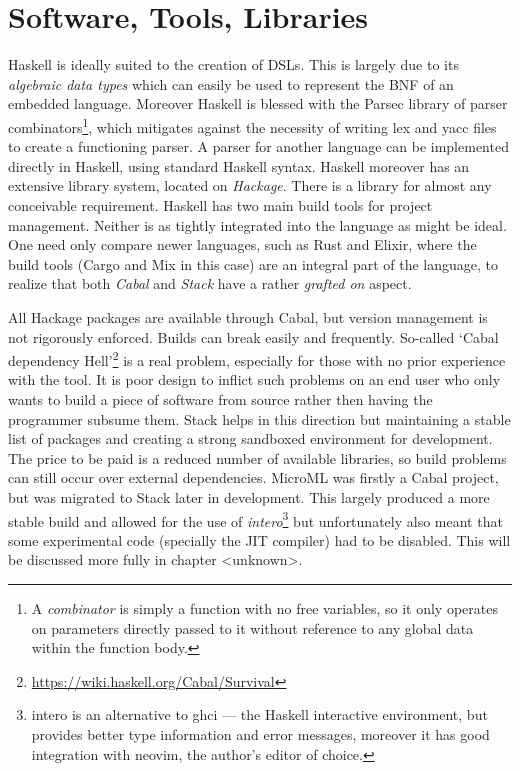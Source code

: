 \documentclass[12pt, a4paper]{report}
\begin{document}
\section{Software, Tools, Libraries}
Haskell is ideally suited to the creation of DSLs. This is largely due to its \textit{algebraic data
    types} which can easily be used to represent the BNF of an embedded language. Moreover Haskell is
blessed with the Parsec library of parser combinators\footnote{A \textit{combinator} is simply a
    function with no free variables, so it only operates on parameters directly passed to it without
    reference to any global data within the function body.}, which mitigates against the necessity of
writing lex and yacc files to create a functioning parser. A parser for another language can be
implemented directly in Haskell, using standard Haskell syntax. Haskell moreover has an extensive
library system, located on \textit{Hackage}. There is a library for almost any conceivable
requirement. Haskell has two main build tools for project management. Neither is as tightly
integrated into the language as might be ideal. One need only compare newer languages, such as Rust
and Elixir, where the build tools (Cargo and Mix in this case) are an integral part of the language,
to realize that both \textit{Cabal} and \textit{Stack} have a rather \textit{grafted on} aspect.

All Hackage packages are available through Cabal, but version management is not rigorously
enforced. Builds can break easily and frequently. So-called `Cabal dependency
Hell'\footnote{\url{https://wiki.haskell.org/Cabal/Survival}} is a real problem, especially for
those with no prior experience with the tool. It is poor design to inflict such problems on an end
user who only wants to build a piece of software from source rather then having the programmer
subsume them. Stack helps in this direction but maintaining a stable list of packages and creating a
strong sandboxed environment for development. The price to be paid is a reduced number of available
libraries, so build problems can still occur over external dependencies. MicroML was firstly a Cabal
project, but was migrated to Stack later in development. This largely produced a more stable
build and allowed for the use of \textit{intero}\footnote{intero is an alternative to ghci --- the
    Haskell interactive environment, but provides better type information and error messages,
    moreover it has good integration with neovim, the author's editor of choice.} but unfortunately also meant that some experimental
code (specially the JIT compiler) had to be disabled. This will be discussed more fully in chapter
<unknown>.
\end{document}
